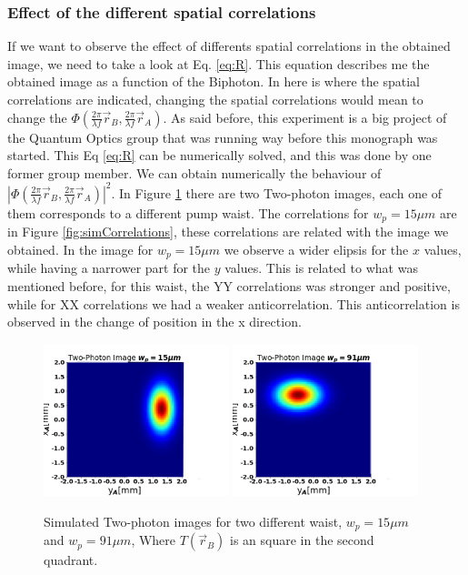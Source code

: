 \subsubsection{Effect of the different spatial correlations}
If we want to observe the effect of differents spatial correlations in the obtained image, we need to take a look at Eq. \ref{eq:R}. This equation
describes me the obtained image as a function of the Biphoton. In here is where the spatial correlations are indicated, changing the spatial
correlations would mean to change the $\Phi (\frac{2 \pi}{\lambda f}\vec{r}_B, \frac{2 \pi}{\lambda f}\vec{r}_A)$. As said before, this experiment is a big project of the Quantum Optics group that was running way before
this monograph was started. This Eq \ref{eq:R} can be numerically solved, and this was done by one former group member. We can obtain numerically
the behaviour of $|\Phi (\frac{2 \pi}{\lambda f}\vec{r}_B, \frac{2 \pi}{\lambda f}\vec{r}_A)|^2$. 
In Figure \ref{fig:simTwo} there are two Two-photon images, each one of them corresponds to a different pump waist. The correlations for
$w_p=15 \mu m$ are in Figure \ref{fig:simCorrelations}, these correlations are related with the image we obtained. In the image for $w_p=15 \mu m$
we observe a wider elipsis for the $x$ values, while having a narrower part for the $y$ values. This is related to what was mentioned before,
for this waist, the YY correlations was stronger and positive, while for XX correlations we had a weaker anticorrelation. This anticorrelation
is observed in the change of position in the x direction.





\begin{figure}[h!]
\centering
{  \includegraphics[width=0.48\textwidth]{Figures/twoPhoSq15.png} }
{  \includegraphics[width=0.48\textwidth]{Figures/twoPhoSq91.png} }
\caption{Simulated Two-photon images for two different waist, $w_p=15 \mu m$ and $w_p=91 \mu m$, Where $T(\vec{r}_B)$ is an square in the second quadrant.}
 \label{fig:simTwo}
\end{figure}




